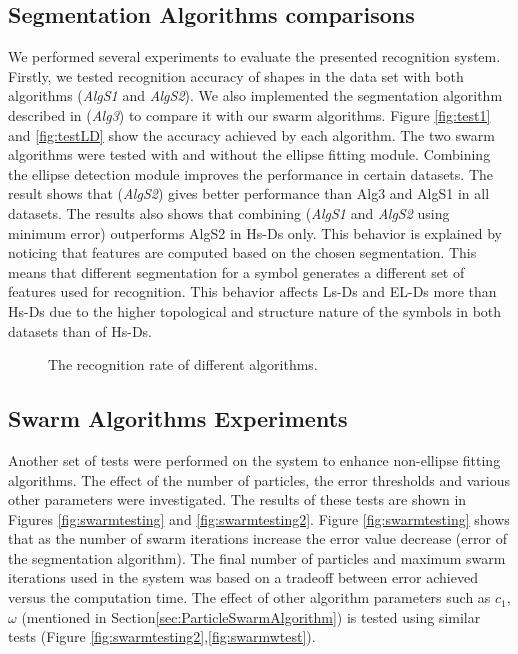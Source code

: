\documentclass[preprint,1p,times,review]{elsarticle}
\begin{document}
\subsection{Segmentation Algorithms comparisons}
\label{sec:AlgExp}
We performed several experiments to evaluate the presented recognition system. Firstly, we tested recognition accuracy of shapes in the data set with both algorithms (\textsl{AlgS1} and \textsl{AlgS2}). We also implemented the segmentation algorithm described in \cite{earlyprocess} (\textsl{Alg3}) to compare it with our swarm algorithms. Figure \ref{fig:test1} and \ref{fig:testLD} show the accuracy achieved by each algorithm. The two swarm algorithms were tested with and without the ellipse fitting module. Combining the ellipse detection module improves the performance in certain datasets. The result shows that (\textsl{AlgS2}) gives better performance than Alg3 and AlgS1 in all datasets.  The results also shows that combining (\textsl{AlgS1} and \textsl{AlgS2} using minimum error) outperforms AlgS2 in Hs-Ds only. This behavior is explained by noticing that features are computed based on the chosen segmentation. This means that different segmentation for a symbol generates a different set of features used for recognition. This behavior affects Ls-Ds and EL-Ds more than Hs-Ds due to the higher topological and structure nature of the symbols in both datasets than of Hs-Ds.

 \begin{figure}
	\centering
	 	\caption{ The recognition rate of different algorithms. }
 \end{figure} 
 \subsection{Swarm Algorithms Experiments}

 Another set of tests were performed on the system to enhance non-ellipse fitting algorithms. The effect of the number of particles, the error thresholds and various other parameters were investigated. The results of these tests are shown in Figures \ref{fig:swarmtesting} and   \ref{fig:swarmtesting2}. Figure \ref{fig:swarmtesting} shows that as the number of swarm iterations increase the error value decrease (error of the segmentation algorithm). The final number of particles and maximum swarm iterations used in the system was based on a tradeoff between error achieved versus the computation time. The effect of other algorithm parameters such as $c_1$, $\omega$ (mentioned in Section\ref{sec:ParticleSwarmAlgorithm}) is tested using similar tests (Figure \ref{fig:swarmtesting2},\ref{fig:swarmwtest}).%
\end{document}
